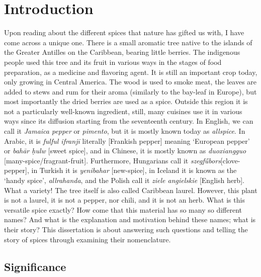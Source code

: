 \chapter{Introduction}
\label{ch:introduction}

Upon reading about the different spices that nature has gifted us with, I have come across a unique one. There is a small aromatic tree native to the islands of the Greater Antilles on the Caribbean, bearing little berries. The indigenous people used this tree and its fruit in various ways in the stages of food preparation, as a medicine and flavoring agent. It is still an important crop today, only growing in Central America. The wood is used to smoke meat, the leaves are added to stews and rum for their aroma (similarly to the bay-leaf in Europe), but most importantly the dried berries are used as a spice. Outside this region it is not a particularly well-known ingredient, still, many cuisines use it in various ways since its diffusion starting from the seventeenth century. In English, we can call it \textit{Jamaica pepper} or \textit{pimento}, but it is mostly known today as \textit{allspice}. In Arabic, it is \textit{fulful ifranjī} literally [Frankish pepper] meaning `European pepper' or \textit{bah\={a}r ḥulw} [sweet spice], and in Chinese, it is mostly known as \textit{duoxiangguo} [many-spice/fragrant-fruit]. Furthermore, Hungarians call it \textit{szegfűbors}[clove-pepper], in Turkish it is \textit{yenibahar} [new-spice], in Iceland it is known as the `handy spice', \textit{allrahanda}, and the Polish call it \textit{ziele angielskie} [English herb]. What a variety! The tree itself is also called Caribbean laurel. However, this plant is not a laurel, it is not a pepper, nor chili, and it is not an herb. What is this versatile spice exactly? How come that this material has so many so different names? And what is the explanation and motivation behind these names; what is their story? This dissertation is about answering such questions and telling the story of spices through examining their nomenclature.

\section{Significance}

